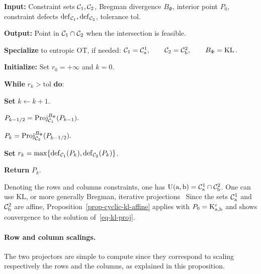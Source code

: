 \begin{alg}\label{alg:cyclic-bregman-projections}
\textbf{Input:} Constraint sets $\mathcal{C}_1,\mathcal{C}_2$, Bregman divergence $B_\Phi$, interior point $P_0$, constraint defects \(\mathrm{def}_{\mathcal{C}_1},\mathrm{def}_{\mathcal{C}_2}\), tolerance $\mathrm{tol}$.

\textbf{Output:} Point in $\mathcal{C}_1\cap\mathcal{C}_2$ when the intersection is feasible.

\textbf{Specialize} to entropic OT, if needed:
\(\mathcal{C}_1=\mathcal{C}^1_{\mathrm{a}}, \qquad \mathcal{C}_2=\mathcal{C}^2_{\mathrm{b}}, \qquad B_\Phi=\operatorname{KL}.\)

\textbf{Initialize:} Set \(r_0=+\infty\) and \(k=0\).

\textbf{While} \(r_k>\mathrm{tol}\) \textbf{do}:
\begin{algblock}

\textbf{Set} \(k\leftarrow k+1\).

\(P_{k-1/2}=\operatorname{Proj}_{\mathcal{C}_1}^{B_\Phi}(P_{k-1}).\)

\(P_k=\operatorname{Proj}_{\mathcal{C}_2}^{B_\Phi}(P_{k-1/2}).\)

\textbf{Set} \(r_k=\max\{\mathrm{def}_{\mathcal{C}_1}(P_k),\mathrm{def}_{\mathcal{C}_2}(P_k)\}\).
\end{algblock}
\algreturnskip
\textbf{Return} $P_k$.
\end{alg}

Denoting
the rows and columns constraints, one has $\mathrm{U}(\mathrm{a},\mathrm{b}) = \mathcal{C}^1_{\mathrm{a}} \cap \mathcal{C}^2_{\mathrm{b}}$. One can use KL, or more generally Bregman, iterative projections~\cite{bregman1967relaxation,Ruschendorf95,RuschendorfThomsen}
Since the sets $\mathcal{C}^1_{\mathrm{a}}$ and $\mathcal{C}^2_{\mathrm{b}}$ are affine, Proposition~\ref{prop-cyclic-kl-affine} applies with $P_0=\mathrm{K}_{\mathrm{a},\mathrm{b}}^\varepsilon$ and shows convergence to the solution of~\eqref{eq-kl-proj}.

\paragraph{Row and column scalings.}

The two projectors are simple to compute since they correspond to scaling respectively the rows and the columns, as explained in this proposition.

